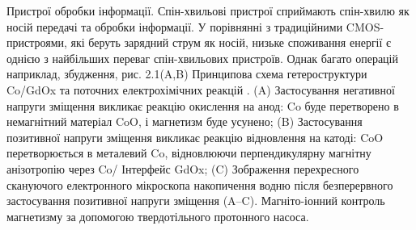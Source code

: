 \documentclass[a4paper,14pt]{extreport}
\begin{document}
Пристрої обробки інформації. Спін-хвильові пристрої сприймають спін-хвилю як носій передачі та обробки інформації. У порівнянні з традиційними CMOS-пристроями, які беруть зарядний струм як носій, низьке споживання енергії є однією з найбільших переваг спін-хвильових пристроїв. Однак багато операцій наприклад, збудження, рис. 2.1(A,B) Принципова схема гетероструктури Co/GdOx та поточних електрохімічних реакцій \cite{lit3}. (A) Застосування негативної напруги зміщення викликає реакцію окислення на анод: Co буде перетворено в немагнітний матеріал CoO, і магнетизм буде усунено; (B) Застосування позитивної напруги зміщення викликає реакцію відновлення на катоді: CoO перетворюється в металевий Co, відновлюючи перпендикулярну магнітну анізотропію через Co/ Інтерфейс GdOx; (C) Зображення перехресного скануючого електронного мікроскопа накопичення водню після безперервного застосування позитивної напруги зміщення (A–C). Магніто-іонний контроль магнетизму за допомогою твердотільного протонного насоса. \\ 
\begin{figure}[h]
   \caption{}
 \end{figure}
\end{document}
